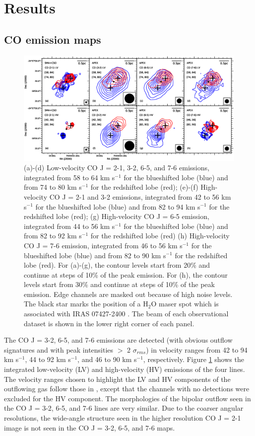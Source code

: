 \section{Results}
\subsection{CO emission maps}

\begin{figure}[htbp]
\includegraphics[scale=.65]{./fig/ori_contourall.eps}
\caption{(a)-(d) Low-velocity CO J = 2-1, 3-2, 6-5, and 7-6 emissions, integrated from 58 to 64 km s$^{-1} $ for the blueshifted lobe (blue) and from 74 to 80 km s$^{-1}$ for the redshifted lobe (red); (e)-(f) High-velocity CO J = 2-1 and 3-2 emissions,  integrated from 42 to 56 km s$^{-1} $ for the blueshifted lobe (blue) and from 82 to 94 km s$^{-1}$ for the redshifted lobe (red); (g) High-velocity CO J = 6-5 emission, integrated from 44 to 56 km s$^{-1} $ for the blueshifted lobe (blue) and from 82 to 92 km s$^{-1}$ for the redshifted lobe (red) (h) High-velocity CO J = 7-6 emission, integrated from 46 to 56 km s$^{-1} $ for the blueshifted lobe (blue) and from 82 to 90 km s$^{-1}$ for the redshifted lobe (red). For (a)-(g), the contour levels start from 20\% and continue at steps of 10\% of the peak emission. For (h), the contour levels start from 30\% and continue at steps of 10\% of the peak emission. Edge channels are masked out because of high noise levels. The black star marks the position of a H$_2$O maser spot which is associated with IRAS 07427-2400 \citep{2015PASJ...67...69S}. The beam of each observational dataset is shown in the lower right corner of each panel. \label{fig:figcontour}}
\end{figure}

The CO J = 3-2, 6-5, and 7-6 emissions are detected (with obvious outflow signatures and with peak intensities $>$ 2 $\sigma_{rms}$) in velocity ranges from 42 to 94 km s$^{-1}$, 44 to 92 km s$^{-1}$, and 46 to 90 km s$^{-1}$, respectively. Figure \ref{fig:figcontour} shows the integrated low-velocity (LV) and high-velocity (HV) emissions of the four lines. The velocity ranges chosen to highlight the LV and HV components of the outflowing gas follow those in \citet{2009ApJ...696...66Q}, except that the channels with no detections were excluded for the HV component. The morphologies of the bipolar outflow seen in the CO J = 3-2, 6-5, and 7-6 lines are very similar. Due to the coarser angular resolutions, the wide-angle structure seen in the higher resolution CO J = 2-1 image is not seen in the CO J = 3-2, 6-5, and 7-6 maps.

